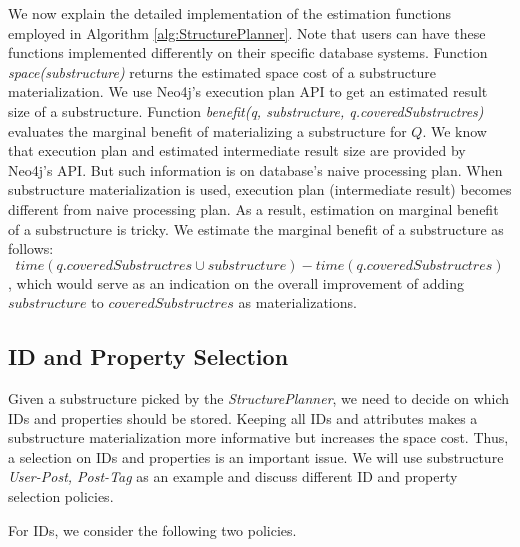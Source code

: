 We now explain the detailed implementation of the estimation functions employed in Algorithm \ref{alg:StructurePlanner}. Note that users can have these functions implemented differently on their specific database systems. Function \textit{space(substructure)} returns the estimated space cost of a substructure materialization. We use Neo4j's execution plan API to get an estimated result size of a substructure. Function \textit{benefit(q, substructure, q.coveredSubstructres)} evaluates the marginal benefit of materializing a substructure for $Q$. We know that execution plan and estimated intermediate result size are provided by Neo4j's API. But such information is on database's naive processing plan. When substructure materialization is used, execution plan (intermediate result) becomes different from naive processing plan. As a result, estimation on marginal benefit of a substructure is tricky. We estimate the marginal benefit of a substructure as follows:
\begin{displaymath}
time(q.coveredSubstructres \cup substructure) - time(q.coveredSubstructres)
\end{displaymath}
\noindent , which would serve as an indication on the overall improvement of adding $substructure$ to $coveredSubstructres$ as materializations.


\subsection{ID and Property Selection}

Given a substructure picked by the \emph{StructurePlanner}, we need to decide on which IDs and properties should be stored. Keeping all IDs and attributes makes a substructure materialization more informative but increases the space cost. %
Thus, a selection on IDs and properties is an important issue. We will use substructure \textit{User-Post, Post-Tag} as an example and discuss different ID and property selection policies.

For IDs, we consider the following two policies.

